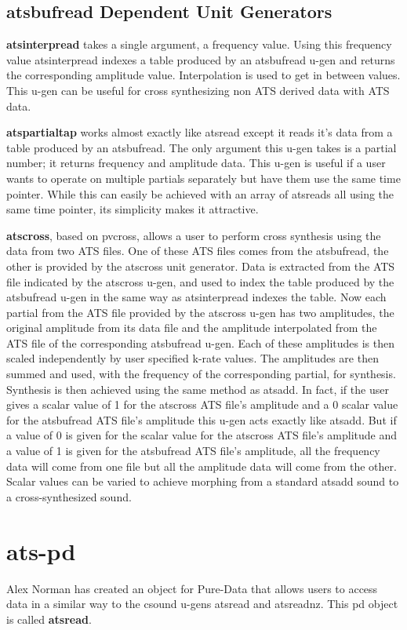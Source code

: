 \documentclass[10pt,letterpaper]{article}
\begin{document}
\subsection{atsbufread Dependent Unit Generators}
\textbf{atsinterpread} takes a single argument, a frequency value.  Using this frequency value atsinterpread indexes a table produced by an atsbufread u-gen and returns the corresponding amplitude value.  Interpolation is used to get in between values.  This u-gen can be useful for cross synthesizing non ATS derived data with ATS data.

\textbf{atspartialtap} works almost exactly like atsread except it reads it's data from a table produced by an atsbufread.  The only argument this u-gen takes is a partial number; it returns frequency and amplitude data.  This u-gen is useful if a user wants to operate on multiple partials separately but have them use the same time pointer.  While this can easily be achieved with an array of atsreads all using the same time pointer, its simplicity makes it attractive.

\textbf{atscross}, based on pvcross, allows a user to perform cross synthesis using the data from two ATS files.  One of these ATS files comes from the atsbufread, the other is provided by the atscross unit generator.  Data is extracted from the ATS file indicated by the atscross u-gen, and used to index the table produced by the atsbufread u-gen in the same way as atsinterpread indexes the table.  Now each partial from the ATS file provided by the atscross u-gen has two amplitudes, the original amplitude from its data file and the amplitude interpolated from the ATS file of the corresponding atsbufread u-gen.  Each of these amplitudes is then scaled independently by user specified k-rate values.  The amplitudes are then summed and used, with the frequency of the corresponding partial, for synthesis.  Synthesis is then achieved using the same method as atsadd.  In fact, if the user gives a scalar value of 1 for the atscross ATS file's amplitude and a 0 scalar value for the atsbufread ATS file's amplitude this u-gen acts exactly like atsadd.  But if a value of 0 is given for the scalar value for the atscross ATS file's amplitude and a value of 1 is given for the atsbufread ATS file's amplitude, all the frequency data will come from one file but all the amplitude data will come from the other.  Scalar values can be varied to achieve morphing from a standard atsadd sound to a cross-synthesized sound.

\section{ats-pd}
Alex Norman has created an object for Pure-Data that allows users to access data in a similar way to the csound u-gens atsread and atsreadnz.  This pd object is called \textbf{atsread}.
\end{document}
